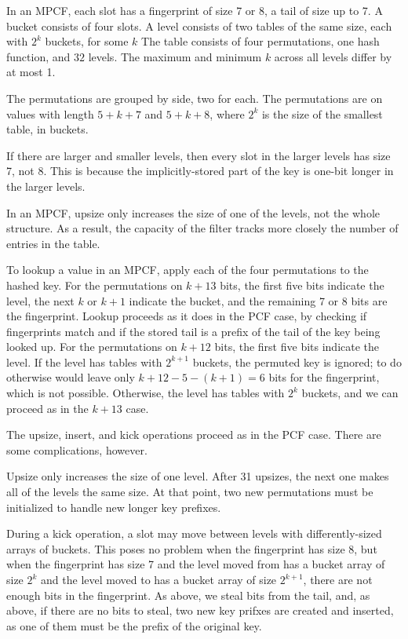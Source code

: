 \documentclass[letterpaper, 11pt]{article}
\begin{document}
In an MPCF, each slot has a fingerprint of size 7 or 8, a tail of size up to 7.
A bucket consists of four slots.
A level consists of two tables of the same size, each with $2^k$ buckets, for some $k$
The table consists of four permutations, one hash function, and $32$ levels.
The maximum and minimum $k$ across all levels differ by at most 1.

The permutations are grouped by side, two for each.
The permutations are on values with length $5 + k + 7$ and $5 + k + 8$, where $2^k$ is the size of the smallest table, in buckets.

If there are larger and smaller levels, then every slot in the larger levels has size 7, not 8.
This is because the implicitly-stored part of the key is one-bit longer in the larger levels.

In an MPCF, upsize only increases the size of one of the levels, not the whole structure.
As a result, the capacity of the filter tracks more closely the number of entries in the table.

To lookup a value in an MPCF, apply each of the four permutations to the hashed key.
For the permutations on $k + 13$ bits, the first five bits indicate the level, the next $k$ or $k+1$ indicate the bucket, and the remaining 7 or 8 bits are the fingerprint.
Lookup proceeds as it does in the PCF case, by checking if fingerprints match and if the stored tail is a prefix of the tail of the key being looked up.
For the permutations on $k + 12$ bits, the first five bits indicate the level.
If the level has tables with $2^{k+1}$ buckets, the permuted key is ignored; to do otherwise would leave only $k+12 - 5 - (k+1) = 6$ bits for the fingerprint, which is not possible.
Otherwise, the level has tables with $2^k$ buckets, and we can proceed as in the $k+13$ case.

The upsize, insert, and kick operations proceed as in the PCF case.
There are some complications, however.

Upsize only increases the size of one level.
After 31 upsizes, the next one makes all of the levels the same size.
At that point, two new permutations must be initialized to handle new longer key prefixes.

During a kick operation, a slot may move between levels with differently-sized arrays of buckets.
This poses no problem when the fingerprint has size 8, but when the fingerprint has size 7 and the level moved from has a bucket array of size $2^k$ and the level moved to has a bucket array of size $2^{k+1}$,  there are not enough bits in the fingerprint.
As above, we steal bits from the tail, and, as above, if there are no bits to steal, two new key prifxes are created and inserted, as one of them must be the prefix of the original key.
\end{document}
